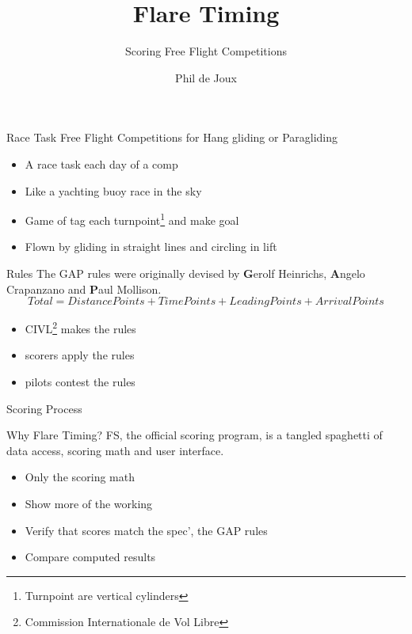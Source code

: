 \documentclass{beamer}
\title{Flare Timing}
\subtitle{Scoring Free Flight Competitions}
\author{Phil de Joux}
\institute{Block Scope}
\date{}
\begin{document}
\begin{frame}
\titlepage
\end{frame}

\begin{frame}{Race Task}
    Free Flight Competitions for Hang gliding or Paragliding
\begin{itemize}
    \item A race task each day of a comp
    \item Like a yachting buoy race in the sky
    \item Game of tag each turnpoint\footnote{Turnpoint are vertical cylinders} and make goal
    \item Flown by gliding in straight lines and circling in lift
\end{itemize}
\end{frame}


\begin{frame}{Rules}
The GAP rules were originally devised by \textbf{G}erolf Heinrichs, \textbf{A}ngelo Crapanzano and \textbf{P}aul Mollison.
\[ Total = DistancePoints + TimePoints + LeadingPoints + ArrivalPoints \]
    
\begin{itemize}
    \item CIVL\footnote{Commission Internationale de Vol Libre} makes the rules
    \item scorers apply the rules
    \item pilots contest the rules
\end{itemize}
\end{frame}

\begin{frame}{Scoring Process}
\begin{figure}[!ht]
    \centering
    
    \label{fig:scoring-process}
\end{figure}
\end{frame}

\begin{frame}{Why Flare Timing?}
FS, the official scoring program, is a tangled spaghetti of data access, scoring math and user interface.
\begin{itemize}
    \item Only the scoring math
    \item Show more of the working
    \item Verify that scores match the spec', the GAP rules
    \item Compare computed results
\end{itemize}
\end{frame}
\end{document}
